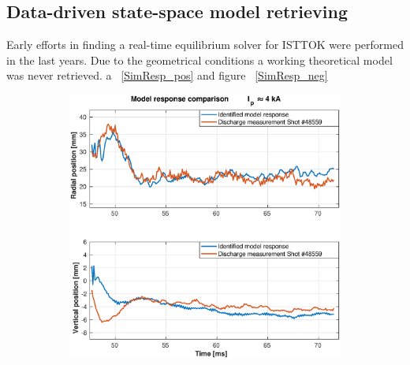 \subsection{Data-driven state-space model retrieving }

Early efforts in finding a real-time equilibrium solver for ISTTOK were performed in the last years. Due to the geometrical conditions a working theoretical model  was never retrieved.  a  ~\ref{SimResp_pos} and figure ~\ref{SimResp_neg}



\begin{figure}
	\begin{subfigure}[b]{0.55\textwidth}
		\includegraphics[width=\textwidth]{Chp5/SimResp_559.eps}  
		\caption{\label{SimResp559} }
	\end{subfigure}
	~ %
	\begin{subfigure}[b]{0.55\textwidth}

\end{subfigure}
\end{figure}
